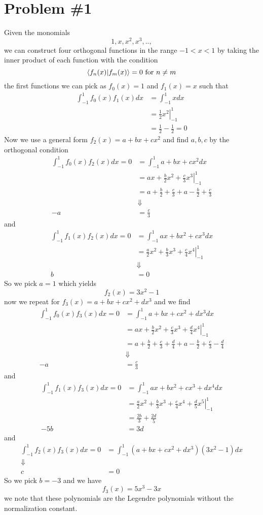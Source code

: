 \documentclass[11pt]{article}
\numberwithin{equation}{section}
\begin{document}


\section{Problem \#1}
Given the monomials 
$$1,x,x^2,x^3,..,$$
we can construct four orthogonal functions in the range $-1<x<1$ by taking the inner product
of each function with the condition
$$\inprod{f_n(x)}{f_m(x)} = 0 \ \textnormal{for} \ n\ne{m}$$
the first functions we can pick as $f_0(x) = 1$ and $f_1(x) = x$ such that
\begin{align*}
\int_{-1}^{1}f_0(x)f_1(x)dx &= \int_{-1}^{1}xdx\\
&= \left.\frac{1}{2}x^2\right|_{-1}^{1}\\
&= \frac{1}{2}-\frac{1}{2} = 0
\end{align*}
Now we use a general form $f_2(x) = a+bx+cx^2$ and find $a,b,c$ by the orthogonal condition
\begin{align*}
\int_{-1}^{1}f_0(x)f_2(x)dx = 0 &= \int_{-1}^{1}a+bx+cx^2dx\\
&=\left.ax + \frac{b}{2}x^2 + \frac{c}{3}x^3\right|_{-1}^{1}\\
&=a + \frac{b}{2} + \frac{c}{3} + a - \frac{b}{2} + \frac{c}{3}\\
&\Downarrow\\
-a &= \frac{c}{3}
\end{align*}
and
\begin{align*}
\int_{-1}^{1}f_1(x)f_2(x)dx = 0 &= \int_{-1}^{1}ax+bx^2+cx^3dx\\
&=\left.\frac{a}{2}x^2 + \frac{b}{3}x^3 + \frac{c}{4}x^4\right|_{-1}^{1}\\
&\Downarrow\\
b &= 0
\end{align*}
So we pick $a=1$ which yields
$$f_2(x) = 3x^2-1$$
now we repeat for $f_3(x) = a+bx+cx^2+dx^3$ and we find
\begin{align*}
\int_{-1}^{1}f_0(x)f_3(x)dx = 0 &= \int_{-1}^{1}a+bx+cx^2+dx^3dx\\
&=\left.ax + \frac{b}{2}x^2 + \frac{c}{3}x^3+\frac{d}{4}x^4\right|_{-1}^{1}\\
&=a + \frac{b}{2} + \frac{c}{3} + \frac{d}{4} + a - \frac{b}{2} + \frac{c}{3} -\frac{d}{4}\\
&\Downarrow\\
-a &= \frac{c}{3}
\end{align*}
and
\begin{align*}
\int_{-1}^{1}f_1(x)f_3(x)dx = 0 &= \int_{-1}^{1}ax+bx^2+cx^3+dx^4dx\\
&=\left.\frac{a}{2}x^2 + \frac{b}{3}x^3 + \frac{c}{4}x^4 + \frac{d}{5}x^5\right|_{-1}^{1}\\
&= \frac{2b}{3} + \frac{2d}{5}\\
-5b &= 3d
\end{align*}
and
\begin{align*}
\int_{-1}^{1}f_2(x)f_3(x)dx = 0 &= \int_{-1}^{1}(a+bx+cx^2+dx^3)(3x^2-1)dx\\
\Downarrow\\
c &= 0
\end{align*}
So we pick $b=-3$ and we have 
$$f_3(x) = 5x^3-3x$$
we note that these polynomials are the Legendre polynomials without the normalization constant.
\end{document}
